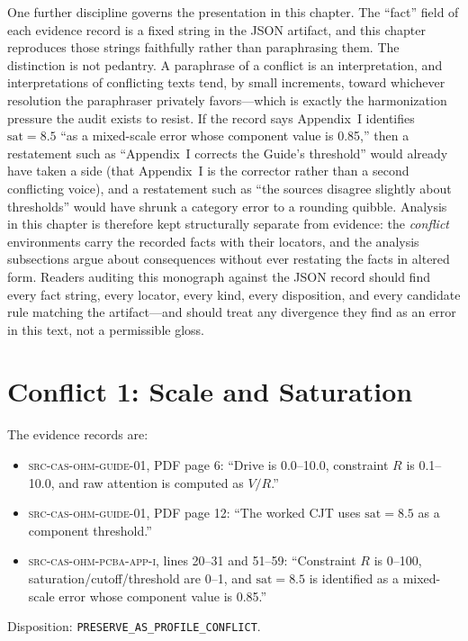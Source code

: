 One further discipline governs the presentation in this chapter. The
``fact'' field of each evidence record is a fixed string in the JSON
artifact, and this chapter reproduces those strings faithfully rather than
paraphrasing them. The distinction is not pedantry. A paraphrase of a
conflict is an interpretation, and interpretations of conflicting texts tend,
by small increments, toward whichever resolution the paraphraser privately
favors---which is exactly the harmonization pressure the audit exists to
resist. If the record says Appendix~I identifies $\mathrm{sat}=8.5$ ``as a
mixed-scale error whose component value is 0.85,'' then a restatement such
as ``Appendix~I corrects the Guide's threshold'' would already have taken a
side (that Appendix~I is the corrector rather than a second conflicting
voice), and a restatement such as ``the sources disagree slightly about
thresholds'' would have shrunk a category error to a rounding quibble.
Analysis in this chapter is therefore kept structurally separate from
evidence: the \emph{conflict} environments carry the recorded facts with
their locators, and the analysis subsections argue about consequences
without ever restating the facts in altered form. Readers auditing this
monograph against the JSON record should find every fact string, every
locator, every kind, every disposition, and every candidate rule matching
the artifact---and should treat any divergence they find as an error in this
text, not a permissible gloss.

\section{Conflict 1: Scale and Saturation}\label{ch04:scale}

\begin{conflict}\label{ch04:conf:scale}
The evidence records are:
\begin{itemize}
\item \textsc{src-cas-ohm-guide-01}, PDF page 6: ``Drive is 0.0--10.0,
constraint $R$ is 0.1--10.0, and raw attention is computed as $V/R$.''
\item \textsc{src-cas-ohm-guide-01}, PDF page 12: ``The worked CJT uses
$\mathrm{sat}=8.5$ as a component threshold.''
\item \textsc{src-cas-ohm-pcba-app-i}, lines 20--31 and 51--59: ``Constraint
$R$ is 0--100, saturation/cutoff/threshold are 0--1, and $\mathrm{sat}=8.5$
is identified as a mixed-scale error whose component value is 0.85.''
\end{itemize}
Disposition: \texttt{PRESERVE\_AS\_PROFILE\_CONFLICT}.
\end{conflict}

